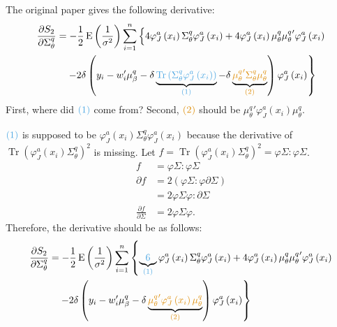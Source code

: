 \documentclass[11pt]{article}
\DeclareMathOperator{\Tr}{Tr}
\newcommand{\opn}{\operatorname}
\begin{document}
The original paper gives the following derivative:
\begin{align*}
  \frac{\partial S_{2}}{\partial \Sigma_{\theta}^{q}} &= -\frac{1}{2}\opn{E}\left(\frac{1}{\sigma^{2}}\right)\sum_{i=1}^{n}\left\{4\varphi_{J}^{a}\left(x_{i}\right)\Sigma_{\theta}^{q}\varphi_{J}^{a}\left(x_{i}\right)+4\varphi_{J}^{a}\left(x_{i}\right)\mu_{\theta}^{q}{\mu_{\theta}^{q}}'\varphi_{J}^{a}\left(x_{i}\right)\right.\\
  &\quad \left. -2\delta\left(y_{i}-w_{i}'\mu_{\beta}^{q}-\delta\underbrace{\textcolor{myblue}{\Tr\left(\Sigma_{\theta}^{q}\varphi_{J}^{a}\left(x_{i}\right)\right)}}_{\textcolor{myblue}{(1)}}-\delta\underbrace{\textcolor{myorange}{{\mu_{\theta}^{q}}'\Sigma_{\theta}^{q}\mu_{\theta}^{q}}}_{\textcolor{myorange}{(2)}}\right)\varphi_{J}^{a}\left(x_{i}\right) \right\}
\end{align*}
First, where did $\textcolor{myblue}{(1)}$ come from? Second, $\textcolor{myorange}{(2)}$ should be ${\mu_{\theta}^{q}}'\varphi_{J}^{a}\left(x_{i}\right)\mu_{\theta}^{q}$.\par
$\textcolor{myblue}{(1)}$ is supposed to be $\varphi_{J}^{a}\left(x_{i}\right)\Sigma_{\theta}^{q}\varphi_{J}^{a}\left(x_{i}\right)$ because the derivative of $\Tr\left(\varphi_{J}^{a}\left(x_{i}\right)\Sigma_{\theta}^{q}\right)^{2}$ is missing. Let $f = \Tr\left(\varphi_{J}^{a}\left(x_{i}\right)\Sigma_{\theta}^{q}\right)^{2} = \varphi\Sigma:\varphi\Sigma$.
\begin{align*}
  f &= \varphi\Sigma: \varphi\Sigma\\
  \partial f &= 2\left(\varphi\Sigma: \varphi \partial \Sigma\right)\\
  &= 2\varphi\Sigma\varphi: \partial \Sigma\\
  \frac{\partial f}{\partial \Sigma} &= 2\varphi\Sigma\varphi.
\end{align*}
Therefore, the derivative should be as follows:
\begin{align*}
  \frac{\partial S_{2}}{\partial \Sigma_{\theta}^{q}} &= -\frac{1}{2}\opn{E}\left(\frac{1}{\sigma^{2}}\right)\sum_{i=1}^{n}\left\{\underbrace{\textcolor{myblue}{6}}_{\textcolor{myblue}{(1)}}\varphi_{J}^{a}\left(x_{i}\right)\Sigma_{\theta}^{q}\varphi_{J}^{a}\left(x_{i}\right)+4\varphi_{J}^{a}\left(x_{i}\right)\mu_{\theta}^{q}{\mu_{\theta}^{q}}'\varphi_{J}^{a}\left(x_{i}\right)\right.\\
  &\quad \left. -2\delta\left(y_{i}-w_{i}'\mu_{\beta}^{q}-\delta\underbrace{\textcolor{myorange}{{\mu_{\theta}^{q}}'\varphi_{J}^{a}\left(x_{i}\right)\mu_{\theta}^{q}}}_{\textcolor{myorange}{(2)}}\right)\varphi_{J}^{a}\left(x_{i}\right) \right\}
\end{align*}
\end{document}

